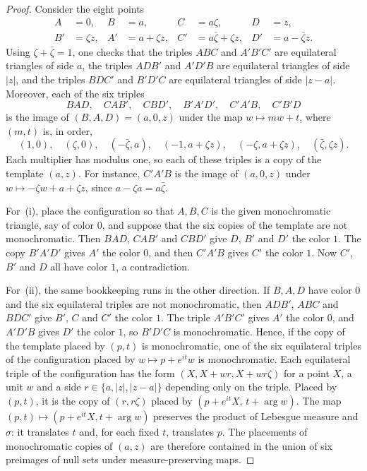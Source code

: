 \documentclass[10pt]{article}
\theoremstyle{remark}
\begin{document}
\begin{proof}
Consider the eight points
\[
\begin{aligned}
 A&=0,& B&=a,& C&=a\zeta,& D&=z,\\
 B'&=\zeta z,& A'&=a+\zeta z,& C'&=a\bar\zeta+\zeta z,& D'&=a-\bar\zeta z.
\end{aligned}
\]
Using $\zeta+\bar\zeta=1$, one checks that the triples $ABC$ and $A'B'C'$ are equilateral triangles of side $a$, the triples $ADB'$ and $A'D'B$ are equilateral triangles of side $|z|$, and the triples $BDC'$ and $B'D'C$ are equilateral triangles of side $|z-a|$. Moreover, each of the six triples
\[
 BAD,\quad CAB',\quad CBD',\quad B'A'D',\quad C'A'B,\quad C'B'D
\]
is the image of $(B,A,D)=(a,0,z)$ under the map $w\mapsto mw+t$, where $(m,t)$ is, in order,
\[
 (1,0),\quad(\zeta,0),\quad(-\bar\zeta,a),\quad(-1,a+\zeta z),\quad(-\zeta,a+\zeta z),\quad(\bar\zeta,\zeta z).
\]
Each multiplier has modulus one, so each of these triples is a copy of the template $(a,z)$. For instance, $C'A'B$ is the image of $(a,0,z)$ under $w\mapsto-\zeta w+a+\zeta z$, since $a-\zeta a=a\bar\zeta$.

For~(i), place the configuration so that $A,B,C$ is the given monochromatic triangle, say of color $0$, and suppose that the six copies of the template are not monochromatic. Then $BAD$, $CAB'$ and $CBD'$ give $D$, $B'$ and $D'$ the color $1$. The copy $B'A'D'$ gives $A'$ the color $0$, and then $C'A'B$ gives $C'$ the color $1$. Now $C'$, $B'$ and $D$ all have color $1$, a contradiction.

For~(ii), the same bookkeeping runs in the other direction. If $B,A,D$ have color $0$ and the six equilateral triples are not monochromatic, then $ADB'$, $ABC$ and $BDC'$ give $B'$, $C$ and $C'$ the color $1$. The triple $A'B'C'$ gives $A'$ the color $0$, and $A'D'B$ gives $D'$ the color $1$, so $B'D'C$ is monochromatic. Hence, if the copy of the template placed by $(p,t)$ is monochromatic, one of the six equilateral triples of the configuration placed by $w\mapsto p+e^{it}w$ is monochromatic. Each equilateral triple of the configuration has the form $(X,X+wr,X+wr\zeta)$ for a point $X$, a unit $w$ and a side $r\in\{a,|z|,|z-a|\}$ depending only on the triple. Placed by $(p,t)$, it is the copy of $(r,r\zeta)$ placed by $(p+e^{it}X,\,t+\arg w)$. The map $(p,t)\mapsto(p+e^{it}X,t+\arg w)$ preserves the product of Lebesgue measure and $\sigma$: it translates $t$ and, for each fixed $t$, translates $p$. The placements of monochromatic copies of $(a,z)$ are therefore contained in the union of six preimages of null sets under measure-preserving maps.
\end{proof}
\end{document}
